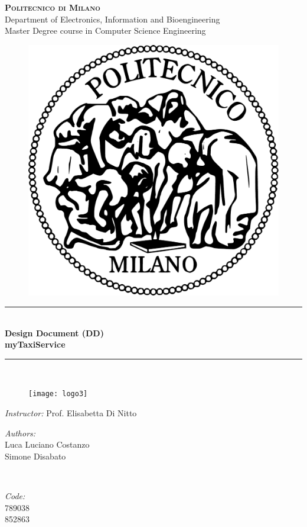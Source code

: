 \documentclass[12pt]{report}
\begin{document}
\pagestyle{empty}

\cleardoublepage


\begin{titlepage}

\newcommand{\HRule}{\rule{\linewidth}{0.5mm}} %

\center %

\textsc{\huge \bf{Politecnico di Milano}}\\[0.5cm]
\textsf{\Large Department of Electronics, Information and Bioengineering}\\[0.25cm] %
\textsf{\large Master Degree course in Computer Science Engineering}\\[0.5cm] %

\begin{figure}[h]
	\centering
	\includegraphics[width = 3 cm]{Figures/PoliMi}
\end{figure}


\HRule \\
{\Huge \bfseries {Design Document (DD)} \\[0.2cm] \Large {myTaxiService}}\\ %
\HRule \\[0.2cm]

\begin{figure}[h]
	\center
	\texttt{[image: logo3]}
\end{figure}


\begin{flushleft}
	\large \textit{Instructor:} Prof. Elisabetta Di Nitto \\[0.5cm]

\begin{minipage}{0.45\textwidth}
\begin{flushleft} \large
\emph{Authors:}\\
Luca Luciano Costanzo\\
Simone Disabato
\end{flushleft}
\end{minipage}
~
\begin{minipage}{0.45\textwidth}
\begin{flushright} \large
\emph{Code:} \\
789038\\
852863
\end{flushright}
\end{minipage}\\[1cm]


\end{flushleft}
\end{titlepage}
\end{document}
